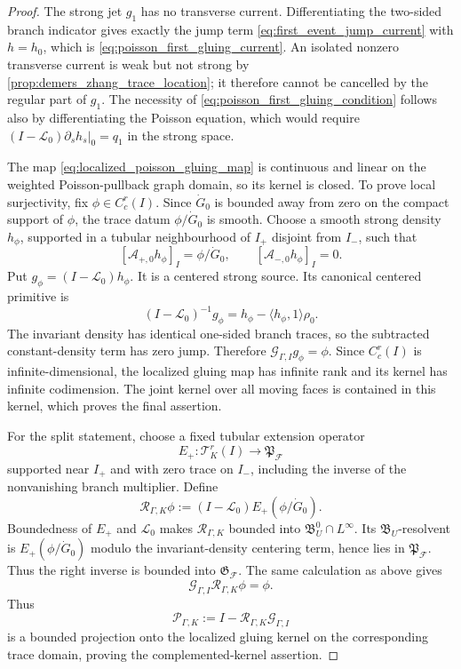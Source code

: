 \documentclass[11pt]{amsart}
\theoremstyle{compactplain}
\theoremstyle{compactdefinition}
\theoremstyle{compactremark}
\newcommand{\Ltransfer}{\mathscr L}
\begin{document}
\begin{proof}
The strong jet \(g_1\) has no transverse current.  Differentiating the
two-sided branch indicator gives exactly the jump term
\eqref{eq:first_event_jump_current} with \(h=h_0\), which is
\eqref{eq:poisson_first_gluing_current}.  An isolated nonzero transverse
current is weak but not strong by
\cref{prop:demers_zhang_trace_location}; it therefore cannot be cancelled by
the regular part of \(g_1\).  The necessity of
\eqref{eq:poisson_first_gluing_condition} follows also by differentiating the
Poisson equation, which would require
\((I-\Ltransfer_0)\partial_sh_s|_0=q_1\) in the strong space.

The map \eqref{eq:localized_poisson_gluing_map} is continuous and linear on the
weighted Poisson-pullback graph domain, so its kernel is closed.  To prove local surjectivity,
fix \(\phi\in C_c^r(I)\).  Since \(\dot G_0\) is bounded away from zero on the
compact support of \(\phi\), the trace datum \(\phi/\dot G_0\) is smooth.
Choose a smooth strong density \(h_\phi\), supported in a tubular
neighbourhood of \(I_+\) disjoint from \(I_-\), such that
\[
 [\mathcal A_{+,0}h_\phi]_I=\phi/\dot G_0,
 \qquad [\mathcal A_{-,0}h_\phi]_I=0.
\]
Put \(g_\phi=(I-\Ltransfer_0)h_\phi\).  It is a centered strong source.  Its
canonical centered primitive is
\[
 (I-\Ltransfer_0)^{-1}g_\phi
 =h_\phi-\langle h_\phi,1\rangle\rho_0.
\]
The invariant density has identical one-sided branch traces, so the subtracted
constant-density term has zero jump.  Therefore
\(\mathcal G_{\Gamma,I}g_\phi=\phi\).  Since
\(C_c^r(I)\) is infinite-dimensional, the localized gluing map has infinite
rank and its kernel has infinite codimension.  The joint kernel over all
moving faces is contained in this kernel, which proves the final assertion.

For the split statement, choose a fixed tubular extension operator
\[
 E_+:\mathcal T_K^r(I)\longrightarrow\mathfrak P_{\mathscr F}
\]
supported near \(I_+\) and with zero trace on \(I_-\), including the inverse
of the nonvanishing branch multiplier.  Define
\begin{equation}
\label{eq:localized_gluing_right_inverse}
 \mathcal R_{\Gamma,K}\phi
 :=(I-\Ltransfer_0)E_+\!\left(\phi/\dot G_0\right).
\end{equation}
Boundedness of \(E_+\) and \(\Ltransfer_0\) makes
\(\mathcal R_{\Gamma,K}\) bounded into
\(\mathfrak B_U^0\cap L^\infty\).  Its \(\mathfrak B_U\)-resolvent is
\(E_+(\phi/\dot G_0)\) modulo the invariant-density centering term, hence lies
in \(\mathfrak P_{\mathscr F}\).  Thus the right inverse is bounded into
\(\mathfrak G_{\mathscr F}\).  The
same calculation as above gives
\[
 \mathcal G_{\Gamma,I}\mathcal R_{\Gamma,K}\phi=\phi.
\]
Thus
\[
 \mathcal P_{\Gamma,K}
 :=I-\mathcal R_{\Gamma,K}\mathcal G_{\Gamma,I}
\]
is a bounded projection onto the localized gluing kernel on the corresponding
trace domain, proving the complemented-kernel assertion.


\end{proof}
\end{document}

